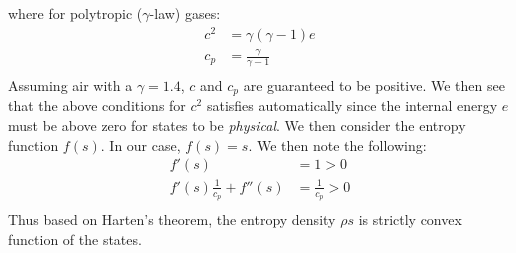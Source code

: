 \documentclass[a4paper]{article}
\numberwithin{equation}{section}
\begin{document}
where for polytropic ($\gamma$-law) gases:
\begin{equation}
    \begin{split}
        c^2 &= \gamma(\gamma -1) e\\
        c_p &= \frac{\gamma}{\gamma - 1}\\
    \end{split}
\end{equation}
Assuming air with a $\gamma = 1.4$, $c$ and $c_p$ are guaranteed to be positive. We then see that the above conditions for $c^2$ satisfies automatically since the internal energy $e$ must be above zero for states to be \textit{physical}. We then consider the entropy function $f(s)$. In our case, $f(s) = s$. We then note the following:
\begin{equation}
    \begin{split}
        f'(s) &= 1 > 0\\
        f'(s)\frac{1}{c_p} + f''(s) &= \frac{1}{c_p} > 0\\
    \end{split}
\end{equation}
Thus based on Harten's theorem, the entropy density $\rho s$ is strictly convex function of the states. 
\end{document}
